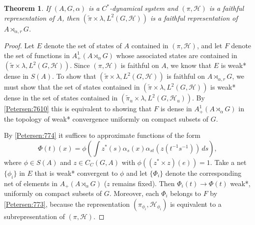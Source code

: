 \documentclass{book}
\newtheorem{theorem}[definition]{Theorem}
\begin{document}
\begin{theorem}\label{Petersen:775}
  If \((A, G, \alpha)\) is a \(C^*\)-dynamical system and \((\pi, \mathcal{H})\) is a faithful representation of \(A\),
  then \((\tilde{\pi}\times\lambda, L^2(G, \mathcal{H}))\) is a faithful representation of \(A\rtimes_{\alpha,r}G\).  
\end{theorem}
\begin{proof}
  Let \(E\) denote the set of states of \(A\) contained in \((\pi, \mathcal{H})\), and let \(F\) denote
  the set of functions in \(A^1_+(A\rtimes_\alpha G)\) whose associated states are contained in \((\tilde{\pi}\times\lambda,L^2(G,\mathcal{H}))\).
  Since \((\pi, \mathcal{H})\) is faithful on \(A\), we know that \(E\) is weak* dense in \(S(A)\).
  To show that \((\tilde{\pi}\times\lambda, L^2(G,\mathcal{H}))\) is faithful on \(A\rtimes_{\alpha,r}G\), we must
  show that the set of states contained in \((\tilde{\pi}\times\lambda,L^2(G,\mathcal{H}))\) is weak* dense in the set of states contained in \((\tilde{\pi}_u\times\lambda,L^2(G,\mathcal{H}_u))\).
  By \ref{Petersen:7610} this is equivalent to showing that \(F\) is dense in \(A^1_+(A\rtimes_\alpha G)\) in the topology of weak* convergence uniformly on compact subsets of \(G\).\par
  By \ref{Petersen:774} it suffices to approximate functions of the form
  \[
    \Phi(t)(x)=\phi\left(\int z^*(s)\alpha_s(x)\alpha_{st}(z(t^{-1}s^{-1}))\,ds\right),
  \]
  where \(\phi\in S(A)\) and \(z\in C_C(G,A)\) with \(\phi((z^*\times z)(e))=1\).
  Take a net \(\{\phi_i\}\) in \(E\) that is weak* convergent to \(\phi\) and let \(\{\Phi_i\}\) denote the corresponding net 
  of elements in \(A_+(A\rtimes_\alpha G)\) (\(z\) remains fixed). Then \(\Phi_i(t)\rightarrow \Phi(t)\) weak*, uniformly on compact subsets
  of \(G\). Moreover, each \(\Phi_i\) belongs to \(F\) by \ref{Petersen:773}, because the representation \((\pi_{\phi_i},\mathcal{H}_{\phi_i})\) is equivalent to a subrepresentation of \((\pi,\mathcal{H})\).
\end{proof}
\end{document}
